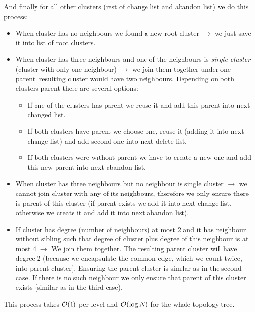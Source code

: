 And finally for all other clusters (rest of change list and abandon list) we do
this process:
\begin{itemize}

\item {\I When cluster has no neighbours we found a new root cluster}
$\rightarrow$ we just save it into list of root clusters.

\item {\I When cluster has three neighbours and one of the neighbours is {\sl single
cluster} (cluster with only one neighbour)} $\rightarrow$ we join them together
under one parent, resulting cluster would have two neighbours. Depending on both
clusters parent there are several options:
	\begin{itemize}
	\item If one of the clusters has parent we reuse it and add this parent
	into next changed list.
	\item If both clusters have parent we choose one, reuse it (adding it
	into next change list) and add second one into next delete list.
	\item If both clusters were without parent we have to create a new one
	and add this new parent into next abandon list.
	\end{itemize}

\item {\I When cluster has three neighbours but no neighbour is single cluster}
$\rightarrow$ we cannot join cluster with any of its neighbours, therefore we
only ensure there is parent of this cluster (if parent exists we add it into
next change list, otherwise we create it and add it into next abandon list).

\item {\I If cluster has degree (number of neighbours) at most 2 and it has
neighbour without sibling such that degree of cluster plus degree of this
neighbour is at most 4} $\rightarrow$ We join them together. The resulting parent cluster
will have degree 2 (because we encapsulate the common edge, which we count
twice, into parent cluster). Ensuring the parent cluster is similar as in the
second case. If there is no such neighbour we only ensure that parent of this cluster exists
(similar as in the third case).

\end{itemize}

This process takes ${\cal O}(1)$ per level and ${\cal O}(\log N)$ for the whole topology tree.


